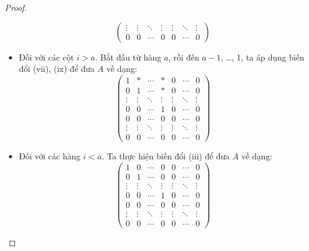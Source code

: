 \documentclass[class=nhvh-linear-algebra,crop=false]{standalone}
\begin{document}
\begin{proof}
\begin{itemize}
\[\begin{pmatrix}
                      \vdots & \vdots & \ddots & \vdots & \vdots & \ddots & \vdots \\
                      0      & 0      & \cdots & 0      & 0      & \cdots & 0
                  \end{pmatrix}
              \]
        \item Đối với các cột $i > a$. Bắt đầu từ hàng $a$, rồi đến $a-1$, \ldots, 1, ta áp dụng biến đổi (vii), (ix) để đưa $A$ về dạng:
              \[
                  \begin{pmatrix}
                      1      & *      & \cdots & *      & 0      & \cdots & 0      \\
                      0      & 1      & \cdots & *      & 0      & \cdots & 0      \\
                      \vdots & \vdots & \ddots & \vdots & \vdots & \ddots & \vdots \\
                      0      & 0      & \cdots & 1      & 0      & \cdots & 0      \\
                      0      & 0      & \cdots & 0      & 0      & \cdots & 0      \\
                      \vdots & \vdots & \ddots & \vdots & \vdots & \ddots & \vdots \\
                      0      & 0      & \cdots & 0      & 0      & \cdots & 0
                  \end{pmatrix}
              \]
        \item Đối với các hàng $i < a$. Ta thực hiện biến đổi (iii) để đưa $A$ về dạng:
              \[
                  \begin{pmatrix}
                      1      & 0      & \cdots & 0      & 0      & \cdots & 0      \\
                      0      & 1      & \cdots & 0      & 0      & \cdots & 0      \\
                      \vdots & \vdots & \ddots & \vdots & \vdots & \ddots & \vdots \\
                      0      & 0      & \cdots & 1      & 0      & \cdots & 0      \\
                      0      & 0      & \cdots & 0      & 0      & \cdots & 0      \\
                      \vdots & \vdots & \ddots & \vdots & \vdots & \ddots & \vdots \\
                      0      & 0      & \cdots & 0      & 0      & \cdots & 0
                  \end{pmatrix}
\]
\end{itemize}
\end{proof}
\end{document}
